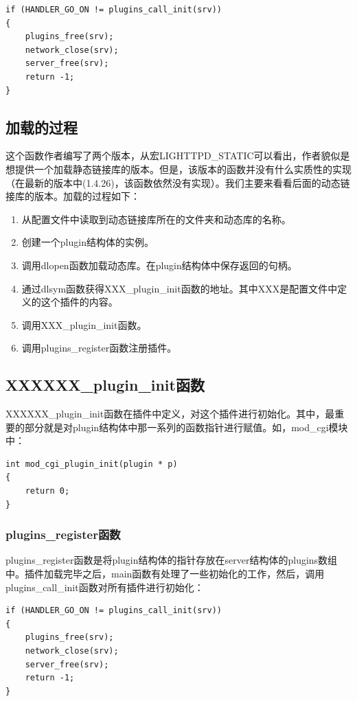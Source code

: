\documentclass[12pt, dvipdfm]{article}
\begin{document}
\begin{verbatim}
if (HANDLER_GO_ON != plugins_call_init(srv)) 
{
	plugins_free(srv);
	network_close(srv);
	server_free(srv);
	return -1;
}
\end{verbatim}


\subsection{加载的过程}
这个函数作者编写了两个版本，从宏LIGHTTPD\_STATIC可以看出，作者貌似是想提供一个加载静态链接库的版本。但是，该版本的函数并没有什么实质性的实现（在最新的版本中(1.4.26)，该函数依然没有实现）。我们主要来看看后面的动态链接库的版本。加载的过程如下：
\begin{enumerate}
	\item 从配置文件中读取到动态链接库所在的文件夹和动态库的名称。
	\item 创建一个plugin结构体的实例。
	\item 调用dlopen函数加载动态库。在plugin结构体中保存返回的句柄。
	\item 通过dlsym函数获得XXX\_plugin\_init函数的地址。其中XXX是配置文件中定义的这个插件的内容。
	\item 调用XXX\_plugin\_init函数。
	\item 调用plugins\_register函数注册插件。
\end{enumerate}

\subsection{XXXXXX\_plugin\_init函数}
XXXXXX\_plugin\_init函数在插件中定义，对这个插件进行初始化。其中，最重要的部分就是对plugin结构体中那一系列的函数指针进行赋值。如，mod\_cgi模块中：

\begin{verbatim}
int mod_cgi_plugin_init(plugin * p)
{
	return 0;
}
\end{verbatim}


\subsubsection{plugins\_register函数}
plugins\_register函数是将plugin结构体的指针存放在server结构体的plugins数组中。插件加载完毕之后，main函数有处理了一些初始化的工作，然后，调用plugins\_call\_init函数对所有插件进行初始化：

\begin{verbatim}
if (HANDLER_GO_ON != plugins_call_init(srv)) 
{
	plugins_free(srv);
	network_close(srv);
	server_free(srv);
	return -1;
}
\end{verbatim}
\end{document}
